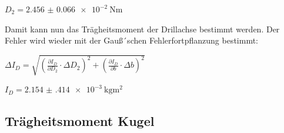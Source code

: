 \centerline{$D_2 = \SI{2.456(66)e-2}{\N\meter}$}

Damit kann nun das Trägheitsmoment der Drillachse bestimmt werden. Der Fehler wird
wieder mit der Gauß´schen Fehlerfortpflanzung bestimmt:

$\Delta I_D = \sqrt{\left(\frac{\partial I_D}{\partial D_2} \cdot \Delta D_2 \right)^2 +
\left(\frac{\partial I_D}{\partial b} \cdot \Delta b \right)^2}$

\centerline{$I_D = \SI{2.154(414)e-3}{\kilo\gram\meter\squared}$}

\subsection{Trägheitsmoment Kugel}
